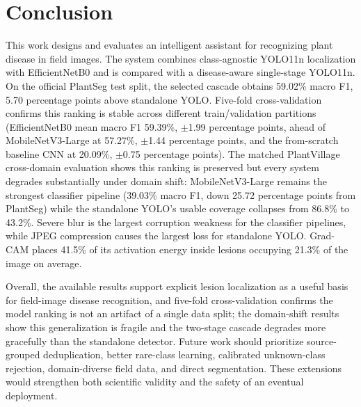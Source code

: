 \documentclass[conference]{IEEEtran}
\newcommand{\ppoints}{percentage points}
\begin{document}
\section{Conclusion}

This work designs and evaluates an intelligent assistant for recognizing plant disease in field
images. The system combines class-agnostic YOLO11n localization with EfficientNetB0 and is compared
with a disease-aware single-stage YOLO11n. On the official PlantSeg test split, the selected
cascade obtains 59.02\% macro F1, 5.70 \ppoints{} above standalone YOLO. Five-fold cross-validation
confirms this ranking is stable across different train/validation partitions (EfficientNetB0 mean
macro F1 59.39\%, $\pm$1.99 \ppoints, ahead of MobileNetV3-Large at 57.27\%, $\pm$1.44 \ppoints,
and the from-scratch baseline CNN at 20.09\%, $\pm$0.75 \ppoints). The matched PlantVillage
cross-domain evaluation shows this ranking is preserved but every system degrades substantially
under domain shift: MobileNetV3-Large remains the strongest classifier pipeline (39.03\% macro F1,
down 25.72 \ppoints{} from PlantSeg) while the standalone YOLO's usable coverage collapses from
86.8\% to 43.2\%. Severe blur is the largest corruption weakness for the classifier pipelines,
while JPEG compression causes the largest loss for standalone YOLO. Grad-CAM places 41.5\% of its
activation energy inside lesions occupying 21.3\% of the image on average.

Overall, the available results support explicit lesion localization as a useful basis for
field-image disease recognition, and five-fold cross-validation confirms the model ranking is not
an artifact of a single data split; the domain-shift results show this generalization is fragile
and the two-stage cascade degrades more gracefully than the standalone detector. Future
work should prioritize source-grouped
deduplication, better rare-class learning, calibrated unknown-class rejection, domain-diverse field
data, and direct segmentation. These extensions would strengthen both scientific validity and the
safety of an eventual deployment.
\end{document}
